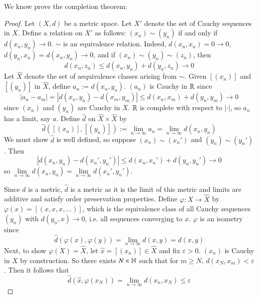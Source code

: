 We know prove the completion theorem:

\begin{proof}
    Let $(X,d)$ be a metric space. Let $X'$ denote the set of Cauchy sequences in $X$. Define a relation on $X'$ as follows: $(x_n)\sim(y_n)$ if and only if $d(x_n,y_n)\rightarrow 0$. $\sim$ is an equivalence relation. Indeed, $d(x_n,x_n) = 0\rightarrow 0$, $d(y_n,x_n) = d(x_n,y_n)\rightarrow 0$, and if $(x_n)\sim (y_n)\sim (z_n)$, then $$d(x_n,z_n)\leq d(x_n,y_n)+d(y_n,z_n)\rightarrow 0$$ Let $\hat{X}$ denote the set of aequivalence classes arising from $\sim$. Given $[(x_n)]$ and $[(y_n)]$ in $\hat{X}$, define $a_n := d(x_n,y_n)$. $(a_n)$ is Cauchy in $\mathbb R$ since $$|a_n - a_m| = |d(x_n,y_n) - d(x_m,y_m)| \leq d(x_n,x_m) + d(y_n,y_m)\rightarrow 0$$ since $(x_n)$ and $(y_n)$ are Cauchy in $X$. $\mathbb R$ is complete with respect to $|\cdot|$, so $a_n$ has a limit, say $a$. Define $\hat{d}$ on $\hat{X}\times \hat{X}$ by $$\hat{d}([(x_n)],[(y_n)]) := \lim\limits_{n\rightarrow \infty}a_n = \lim\limits_{n\rightarrow \infty}d(x_n,y_n)$$ We must show $\hat{d}$ is well defined, so suppose $(x_n) \sim (x_n')$ and $(y_n) \sim (y_n')$. Then $$|d(x_n,y_n) - d(x_n',y_n')| \leq d(x_n,x_n')+d(y_n,y_n')\rightarrow 0$$ so $\lim\limits_{n\rightarrow \infty}d(x_n,y_n) = \lim\limits_{n\rightarrow \infty}d(x_n',y_n')$. 

    Since $d$ is a metric, $\hat{d}$ is a metric as it is the limit of this metric and limits are additive and satisfy order preservation properties. Define $\varphi:X\rightarrow \hat{X}$ by $\varphi(x) = [(x,x,x,...)]$, which is the equivalence class of all Cauchy sequences $(y_n)$ with $d(y_n,x)\rightarrow 0$, i.e. all sequences converging to $x$. $\varphi$ is an isometry since $$\hat{d}(\varphi(x),\varphi(y)) = \lim\limits_{n\rightarrow \infty}d(x,y) = d(x,y)$$ Next, to show $\overline{\varphi(X)} = \hat{X}$, let $\hat{x} = [(x_n)] \in \hat{X}$ and fix $\varepsilon > 0$. $(x_n)$ is Cauchy in $X$ by construction. So there exists $N \in \mathbb N$ such that for $m \geq N$, $d(x_N,x_m) < \varepsilon$. Then it follows that $$\hat{d}(\hat{x},\varphi(x_N)) = \lim\limits_{n\rightarrow \infty}d(x_n,x_N) \leq \varepsilon$$


\end{proof}

